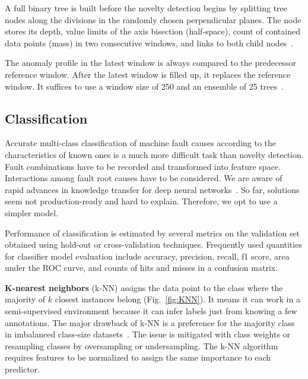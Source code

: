 A full binary tree is built before the novelty detection begins by splitting tree nodes along the divisions in the randomly chosen perpendicular planes. The node stores its depth, value limits of the axis bisection (half-space), count of contained data points (mass) in two consecutive windows, and links to both child nodes~\cite{tan_fast_2011}. 

The anomaly profile in the latest window is always compared to the predecessor reference window. After the latest window is filled up, it replaces the reference window. It suffices to use a window size of 250 and an ensemble of 25 trees~\cite{tan_fast_2011}.

\subsection{Classification}
Accurate multi-class classification of machine fault causes according to the characteristics of known ones is a much more difficult task than novelty detection. Fault combinations have to be recorded and transformed into feature space. Interactions among fault root causes have to be considered. We are aware of rapid advances in knowledge transfer for deep neural networks~\cite{maurya_condition-based_2021}. So far, solutions seem not production-ready and hard to explain. Therefore, we opt to use a simpler model.

Performance of classification is estimated by several metrics on the validation set obtained using hold-out or cross-validation techniques. Frequently used quantities for classifier model evaluation include accuracy, precision, recall, f1 score, area under the ROC curve, and counts of hits and misses in a confusion matrix.
\bigbreak

\textbf{K-nearest neighbors} (k-NN) assigns the data point to the class where the majority of $k$ closest instances belong (Fig.~\ref{fig:KNN}). It means it can work in a semi-supervised environment because it can infer labels just from knowing a few annotations. The major drawback of k-NN is a preference for the majority class in imbalanced class-size datasets~\cite{shi_improving_2020}. The issue is mitigated with class weights or resampling classes by oversampling or undersampling. The k-NN algorithm requires features to be normalized to assign the same importance to each predictor.

